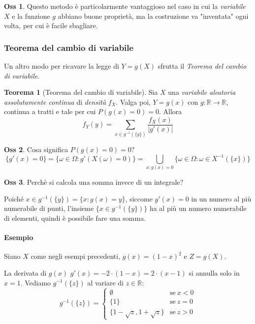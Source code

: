\documentclass[12pt, a4paper]{report}
\theoremstyle{definition}
\newtheorem{theorem}{Teorema}[section]
\newtheorem*{observation}{Oss}
\DeclareRobustCommand{\R}{\mathbb{R}}%
\begin{document}
\begin{observation}
	Questo metodo è particolarmente vantaggioso nel caso in cui la \emph{variabile}
	$X$ e la funzione $g$ abbiano buone proprietà, ma la costruzione va "inventata"
	ogni volta, per cui è facile sbagliare.
\end{observation}

\subsubsection{Teorema del cambio di variabile}
Un altro modo per ricavare la legge di \(Y=g(X)\) sfrutta il \emph{Teorema del
cambio di variabile}.
\begin{theorem}[Teorema del cambio di variabile]
	Sia $X$ una \emph{variabile aleatoria assolutamente continua} di \emph{densità}
	$f_X$. Valga poi, \(Y=g(x)\) con \(g:\R\rightarrow\R\), continua a tratti e
	tale per cui \(P(g(x)=0)=0\). Allora
	\[f_Y(y)=\sum_{x\in g^{-1}(\{y\})}\frac{f_X(x)}{|g'(x)|}\]
\end{theorem}

\begin{observation}
	Cosa significa \(P(g(x)=0)=0?\)
	\[\{g'(x)=0\}=\{\omega\in\Omega:g'(X(\omega)=0)\}=\bigcup_{x:g(x)=0}\{\omega
	\in\Omega:\omega\in X^{-1}(\{x\})\}\]
\end{observation}
\begin{observation}
	Perchè si calcola una somma invece di un integrale?
	
	Poiché \(x\in g^{-1}(\{y\})=\{x:g(x)=y\}\), siccome
	\(g'(x)=0\) in un numero al più numerabile di punti, l'insieme \(\{x\in
	g^{-1}(\{y\})\}\) ha al più un numero numerabile di elementi, quindi è
	possibile fare una somma.
\end{observation}

\paragraph*{Esempio}
Siano $X$ come negli esempi precedenti, \(g(x)=(1-x)^2\) e \(Z=g(X)\).

La derivata di $g(x)$ \(g'(x)=-2\cdot (1-x)=2\cdot (x-1)\) si annulla solo in $x=1$. Vediamo
\(g^{-1}(\{z\})\) al variare di \(z\in\R\):
\[g^{-1}(\{z\})=\begin{cases}
	{\emptyset} & \text{se}\ {x<0}\\
	{\{1\}} & \text{se}\ {z=0}\\
	{\{1-\sqrt{z}, 1+\sqrt{z}\}} & \text{se}\ {z>0}
\end{cases}\]
\end{document}
